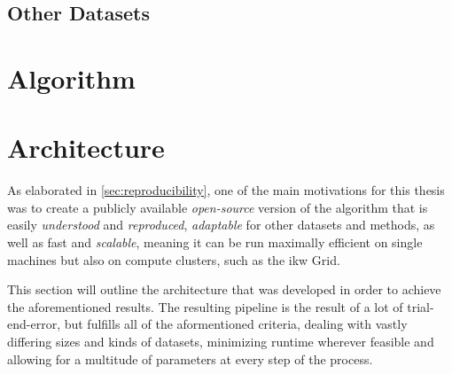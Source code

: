 
\subsection{Other Datasets}



\section{Algorithm}





\section{Architecture}
\label{sec:architecture}

As elaborated in \autoref{sec:reproducibility}, one of the main motivations for this thesis was to create a publicly available \textit{open-source} version of the algorithm that is easily \textit{understood} and \textit{reproduced}, \textit{adaptable} for other datasets and methods, as well as fast and \textit{scalable}, meaning it can be run maximally efficient on single machines but also on compute clusters, such as the \acrshort{ikw} Grid.


This section will outline the architecture that was developed in order to achieve the aforementioned results. The resulting pipeline is the result of a lot of trial-end-error, but fulfills all of the aformentioned criteria, dealing with vastly differing sizes and kinds of datasets, minimizing runtime wherever feasible and allowing for a multitude of parameters at every step of the process. %

